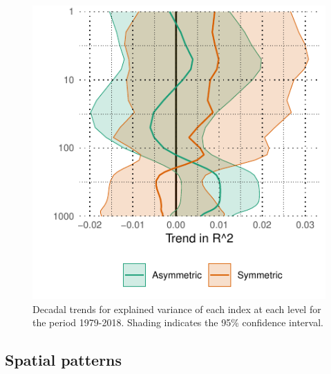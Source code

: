 \documentclass[twocol]{ametsocV5}
\begin{document}
\begin{figure}
\includegraphics{r-squared-trend-1} \caption[Decadal trends for explained variance of each index at each level for the period 1979-2018]{Decadal trends for explained variance of each index at each level for the period 1979-2018. Shading indicates the 95\% confidence interval.}\label{fig:r-squared-trend}
\end{figure}

\subsection{Spatial patterns}
\end{document}
